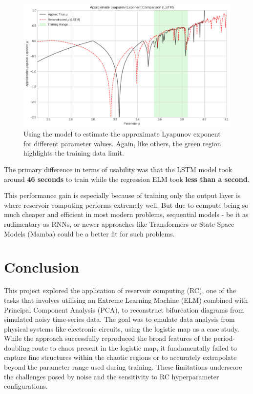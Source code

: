 \documentclass[numbered]{ivt-style/standard}
\begin{document}
\begin{figure}[!htbp]
    \centering
    \includegraphics[width=1\linewidth]{figures/lstm_bd_3.png}
    \caption{Using the model to estimate the approximate Lyapunov exponent for different parameter values. Again, like others, the green region highlights the training data limit.}
    \label{fig:enter-label}
\end{figure}
\FloatBarrier


The primary difference in terms of usability was that the LSTM model took around \textbf{46 seconds} to train while the regression ELM took \textbf{less than a second}. 

This performance gain is especially because of training only the output layer is where reservoir computing performs extremely well. But due to compute being so much cheaper and efficient in most modern problems, sequential models - be it as rudimentary as RNNs, or newer approaches like Transformers or State Space Models (Mamba) \cite{gu2024mambalineartimesequencemodeling} could be a better fit for such problems. 

\section{Conclusion}

This project explored the application of reservoir computing (RC), one of the tasks that involves utilising an Extreme Learning Machine (ELM) combined with Principal Component Analysis (PCA), to reconstruct bifurcation diagrams from simulated noisy time-series data. The goal was to emulate data analysis from physical systems like electronic circuits, using the logistic map as a case study. While the approach successfully reproduced the broad features of the period-doubling route to chaos present in the logistic map, it fundamentally failed to capture fine structures within the chaotic regions or to accurately extrapolate beyond the parameter range used during training. These limitations underscore the challenges posed by noise and the sensitivity to RC hyperparameter configurations.
\end{document}

